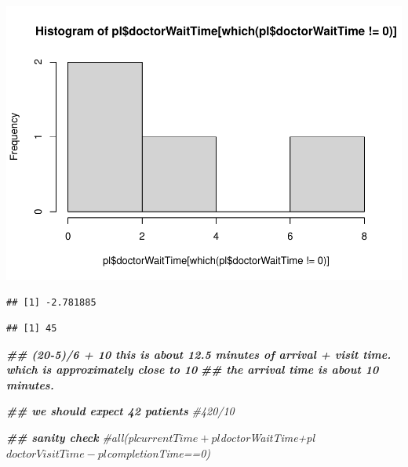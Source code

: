 \documentclass[
]{book}
\newenvironment{Shaded}{\begin{snugshade}}{\end{snugshade}}
\newcommand{\CommentTok}[1]{\textcolor[rgb]{0.56,0.35,0.01}{\textit{#1}}}
\newcommand{\DecValTok}[1]{\textcolor[rgb]{0.00,0.00,0.81}{#1}}
\newcommand{\DocumentationTok}[1]{\textcolor[rgb]{0.56,0.35,0.01}{\textbf{\textit{#1}}}}
\newcommand{\FunctionTok}[1]{\textcolor[rgb]{0.00,0.00,0.00}{#1}}
\newcommand{\NormalTok}[1]{#1}
\newcommand{\SpecialCharTok}[1]{\textcolor[rgb]{0.00,0.00,0.00}{#1}}
\theoremstyle{definition}
\theoremstyle{definition}
\theoremstyle{definition}
\theoremstyle{definition}
\theoremstyle{remark}
\begin{document}
\includegraphics{_main_files/figure-latex/unnamed-chunk-9-3.pdf}

\begin{Shaded}
\end{Shaded}

\begin{verbatim}
## [1] -2.781885
\end{verbatim}

\begin{Shaded}
\end{Shaded}

\begin{verbatim}
## [1] 45
\end{verbatim}

\begin{Shaded}
\begin{Highlighting}[]
\DocumentationTok{\#\# (20{-}5)/6 + 10 this is about 12.5 minutes of arrival + visit time. which is approximately close to 10 }
\DocumentationTok{\#\# the arrival time is about 10 minutes.  }

\DocumentationTok{\#\# we should expect 42 patients}
 \CommentTok{\#420/10}
  
  \DocumentationTok{\#\# sanity check}
  \CommentTok{\#all(pl$currentTime+pl$doctorWaitTime+pl$doctorVisitTime{-}pl$completionTime==0)}
\end{Highlighting}
\end{Shaded}
\end{document}
